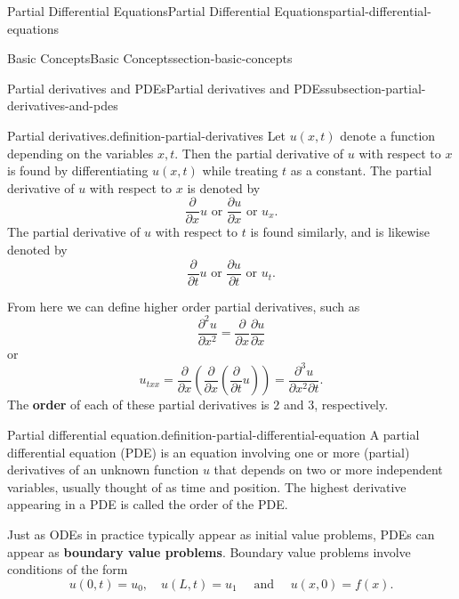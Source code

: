 \documentclass[oneside,10pt,]{book}
\newcommand{\terminology}[1]{\textbf{#1}}
\numberwithin{equation}{section}
\begin{document}
\begin{chapterptx}{Partial Differential Equations}{}{Partial Differential Equations}{}{}{partial-differential-equations}
\begin{sectionptx}{Basic Concepts}{}{Basic Concepts}{}{}{section-basic-concepts}
\begin{subsectionptx}{Partial derivatives and PDEs}{}{Partial derivatives and PDEs}{}{}{subsection-partial-derivatives-and-pdes}
\begin{definition}{Partial derivatives.}{definition-partial-derivatives}%
\hypertarget{p-631}{}%
Let \(u(x,t)\) denote a function depending on the variables \(x,t\). Then the partial derivative of \(u\) with respect to \(x\) is found by differentiating \(u(x,t)\) while treating \(t\) as a constant. The partial derivative of \(u\) with respect to \(x\) is denoted by%
\begin{equation*}
\frac{\partial}{\partial x}u\text{ or }\frac{\partial u}{\partial x}\text{ or }u_{x}.
\end{equation*}
The partial derivative of \(u\) with respect to \(t\) is found similarly, and is likewise denoted by%
\begin{equation*}
\frac{\partial}{\partial t}u\text{ or }\frac{\partial u}{\partial t}\text{ or }u_{t}.
\end{equation*}
%
\end{definition}
\hypertarget{p-632}{}%
From here we can define higher order partial derivatives, such as%
\begin{equation*}
\frac{\partial^{2}u}{\partial x^{2}} = \frac{\partial}{\partial x}\frac{\partial u}{\partial x}
\end{equation*}
or%
\begin{equation*}
u_{txx} = \frac{\partial}{\partial x}\left(\frac{\partial}{\partial x}\left(\frac{\partial}{\partial t}u\right)\right) = \frac{\partial^{3}u}{\partial x^{2}\partial t}.
\end{equation*}
The \terminology{order} of each of these partial derivatives is \(2\) and \(3\), respectively.%
\begin{definition}{Partial differential equation.}{definition-partial-differential-equation}%
\hypertarget{p-633}{}%
A partial differential equation (PDE) is an equation involving one or more (partial) derivatives of an unknown function \(u\) that depends on two or more independent variables, usually thought of as time and position. The highest derivative appearing in a PDE is called the order of the PDE.%
\end{definition}
\hypertarget{p-634}{}%
Just as ODEs in practice typically appear as initial value problems, PDEs can appear as \terminology{boundary value problems}. Boundary value problems involve conditions of the form%
\begin{equation*}
u(0,t) = u_{0},\quad u(L,t) = u_{1} \quad \text{ and }\quad u(x,0) = f(x).
\end{equation*}

\end{subsectionptx}
\end{sectionptx}
\end{chapterptx}
\end{document}
